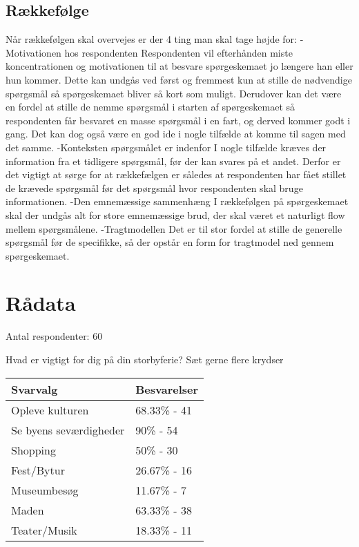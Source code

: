 \subsection{Rækkefølge}
Når rækkefølgen skal overvejes er der 4 ting man skal tage højde for: 
-Motivationen hos respondenten
Respondenten vil efterhånden miste koncentrationen og motivationen til at besvare spørgeskemaet jo længere han eller hun kommer. Dette kan undgås ved først og fremmest kun at stille de nødvendige spørgsmål så spørgeskemaet bliver så kort som muligt. Derudover kan det være en fordel at stille de nemme spørgsmål i starten af spørgeskemaet så respondenten får besvaret en masse spørgsmål i en fart, og derved kommer godt i gang. Det kan dog også være en god ide i nogle tilfælde at komme til sagen med det samme.
-Konteksten spørgsmålet er indenfor 
I nogle tilfælde kræves der information fra et tidligere spørgsmål, før der kan svares på et andet. Derfor er det vigtigt at sørge for at rækkefælgen er således at respondenten har fået stillet de krævede spørgsmål før det spørgsmål hvor respondenten skal bruge informationen.
-Den emnemæssige sammenhæng 
I rækkefølgen på spørgeskemaet skal der undgås alt for store emnemæssige brud, der skal været et naturligt flow mellem spørgsmålene.
-Tragtmodellen
Det er til stor fordel at stille de generelle spørgsmål før de specifikke, så der opstår en form for tragtmodel ned gennem spørgeskemaet.


\section{Rådata}
Antal respondenter: 60

Hvad er vigtigt for dig på din storbyferie?
Sæt gerne flere krydser

    \begin{tabular}{| l | l |}
    \hline
    Svarvalg & Besvarelser \\ \hline
    Opleve kulturen & 68.33\% - 41 \\ \hline
    Se byens seværdigheder & 90\% - 54 \\ \hline
    Shopping & 50\% - 30 \\ \hline
    Fest/Bytur & 26.67\% - 16 \\ \hline
    Museumbesøg & 11.67\% - 7 \\ \hline
    Maden & 63.33\% - 38 \\ \hline
    Teater/Musik & 18.33\% - 11 \\
    \hline
    \end{tabular}
\newline

